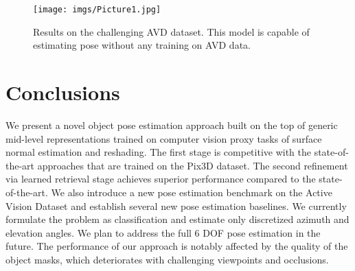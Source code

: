 \documentclass[letterpaper, 10 pt, conference]{ieeeconf}  \pdfoutput=1
\begin{document}
\begin{figure}[htbp]

\begin{center}
\texttt{[image: imgs/Picture1.jpg]}
\end{center}
  \caption{Results on the challenging AVD dataset. This model is capable of estimating pose without any training on AVD data.}
\label{ssresults}
\end{figure}
\begin{table}
\vspace{8pt}
\centering
{}
\caption{Per category accuracy of two models on AVD dataset. The results are for 9 bins with  overlap. }
\label{AVD_category_level_results}
\end{table}




\section{Conclusions}
We present a novel object pose estimation approach built on the top of generic mid-level representations trained on computer vision proxy tasks
of surface normal estimation and reshading. The first stage is competitive with the state-of-the-art approaches that are trained on the Pix3D dataset. The second refinement via learned retrieval stage achieves superior performance compared to the state-of-the-art. 
We also introduce a new pose estimation benchmark on the Active Vision Dataset and establish several new pose estimation baselines. We currently formulate the problem as classification and estimate only discretized azimuth and elevation angles. We plan to address the full 6 DOF pose estimation in the future. The performance of our approach is notably affected by the quality of the object masks, which deteriorates with challenging viewpoints and occlusions.



{\renewcommand*{\bibfont}{\footnotesize}
\printbibliography
}
\end{document}
